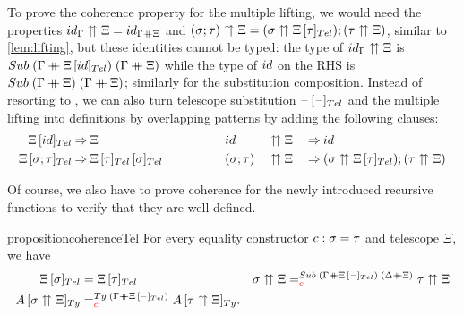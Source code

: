 \documentclass[a4paper,UKenglish,numberwithinsect,cleveref,thm-restate]{lipics-v2021}
\newcommand{\danger}{\marginpar[\hfill\dbend]{\dbend\hfill}}
\begin{document}
To prove the coherence property for the multiple lifting, we would need the properties $\idS_\Gamma \upuparrows \Xi = \idS_{\Gamma \dplus  \Xi}$ and $(\sigma; \tau) \upuparrows \Xi = (\sigma\upuparrows \subTel{\Xi}{\tau}); (\tau \upuparrows \Xi)$, similar to \cref{lem:lifting}, but these identities cannot be typed: the type of $\idS_{\Gamma} \upuparrows \Xi$ is $\Sub\;(\Gamma \dplus \subTel{\Xi}{\idS})\;(\Gamma \dplus \Xi)$ while the type of $\idS$ on the RHS is $\Sub\;(\Gamma \dplus \Xi)\;(\Gamma \dplus \Xi)$; similarly for the substitution composition.
%
Instead of resorting to \transp, we can also turn telescope substitution $\subTel{\blank}{\blank}$ and the multiple lifting into definitions by overlapping patterns by adding the following clauses:
\begin{alignat*}{9}
  \subTel{\Xi}{\idS}          & \reduce \Xi\qquad\qquad
                              && \idS          && \upuparrows \Xi && \reduce \idS \\
  \subTel{\Xi}{\sigma ; \tau} & \reduce \subTel{\subTel{\Xi}{\tau}}{\sigma} \qquad\qquad
                              && (\sigma;\tau) && \upuparrows \Xi && \reduce (\sigma \upuparrows \subTel{\Xi}{\tau}) ; (\tau \upuparrows \Xi)
\end{alignat*}

Of course, we also have to prove coherence for the newly introduced recursive functions to verify that they are well defined.

\begin{restatable}%
{proposition}{coherenceTel}
  For every equality constructor $\cc : \sigma = \tau$ and telescope $\Xi$, we have
  \danger
  \begin{align*}
    \subTel{\Xi}{\sigma} & = \subTel{\Xi}{\tau}
                         && \sigma \upuparrows \Xi =^{\Sub\;(\Gamma\dplus \subTel{\Xi}{\blank})\;(\Delta\dplus\Xi)}_{\alert{\cc}} \tau \upuparrows \Xi \\
    \subTy{A}{\sigma \upuparrows \Xi} & =^{\Ty\;(\Gamma \dplus \subTel{\Xi}{\blank})}_{\alert{\cc}} \subTy{A}{\tau \upuparrows \Xi}.
  \end{align*}
\end{restatable}
\end{document}
